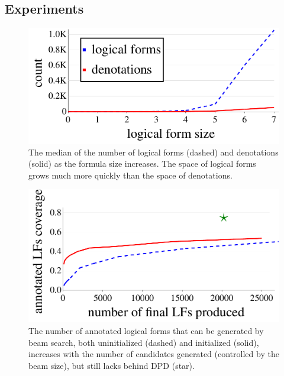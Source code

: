 \subsection{Experiments} \label{sec:dpd-experiment}

\begin{figure}
\centering
\includegraphics[scale=.4]{sfig/dpd.slides/exGrowth.pdf}
\caption[The space of denotations grows much more slowly than the space of logical forms]{The median of the number of
logical forms ({\color{blue}dashed})
and denotations ({\color{red}solid})
as the formula size increases.
The space of logical forms grows much more quickly
than the space of denotations.}
\label{fig:dpd-lf-growth}
\end{figure}

\begin{figure}[t]
\centering
\includegraphics[scale=0.45]{sfig/dpd.slides/exFloat.pdf}
\caption[DPD has more coverage over the
annotated logical forms than beam search]{
The number of annotated logical forms
that can be generated by beam search,
both uninitialized ({\color{blue}dashed})
and initialized ({\color{red}solid}),
increases with the number of candidates generated
(controlled by the beam size),
but still lacks behind DPD ({\color{green!50!black}star}).}
\label{fig:dpd-results}
\end{figure}


